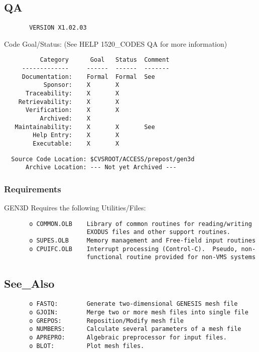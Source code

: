 \subsection{QA}
\begin{verbatim}
       VERSION X1.02.03
\end{verbatim}

Code Goal/Status: (See HELP 1520\_CODES QA for more information)

\begin{verbatim}
          Category      Goal   Status  Comment
     -------------     ------  ------  -------
     Documentation:    Formal  Formal  See
           Sponsor:    X       X
      Traceability:    X       X
    Retrievability:    X       X
      Verification:    X       X
          Archived:    X
   Maintainability:    X       X       See
        Help Entry:    X       X
        Executable:    X       X
\end{verbatim}

\begin{verbatim}
  Source Code Location: $CVSROOT/ACCESS/prepost/gen3d
      Archive Location: --- Not yet Archived ---
\end{verbatim}
\subsubsection{Requirements}
GEN3D Requires the following Utilities/Files:

\begin{verbatim}
       o COMMON.OLB    Library of common routines for reading/writing
                       EXODUS files and other support routines.
       o SUPES.OLB     Memory management and Free-field input routines
       o CPUIFC.OLB    Interrupt processing (Control-C).  Pseudo, non-
                       functional routine provided for non-VMS systems
\end{verbatim}

\subsection{See\_Also}
\begin{verbatim}
       o FASTQ:        Generate two-dimensional GENESIS mesh file
       o GJOIN:        Merge two or more mesh files into single file
       o GREPOS:       Reposition/Modify mesh file
       o NUMBERS:      Calculate several parameters of a mesh file
       o APREPRO:      Algebraic preprocessor for input files.
       o BLOT:         Plot mesh files.
\end{verbatim}



